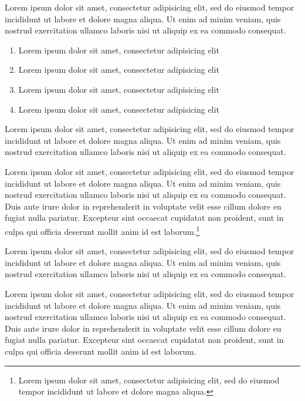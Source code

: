 \documentclass{article}
\begin{document}
\begin{theorem}
Lorem ipsum dolor sit amet, consectetur adipisicing elit, sed do eiusmod tempor incididunt ut labore et dolore magna aliqua. Ut enim ad minim veniam, quis nostrud exercitation ullamco laboris nisi ut aliquip ex ea commodo consequat. 
\end{theorem}

 
\begin{enumerate}
\item Lorem ipsum dolor sit amet, consectetur adipisicing elit
\item Lorem ipsum dolor sit amet, consectetur adipisicing elit
\item Lorem ipsum dolor sit amet, consectetur adipisicing elit
\item Lorem ipsum dolor sit amet, consectetur adipisicing elit
\end{enumerate}

\begin{theorem}
Lorem ipsum dolor sit amet, consectetur adipisicing elit, sed do eiusmod tempor incididunt ut labore et dolore magna aliqua. Ut enim ad minim veniam, quis nostrud exercitation ullamco laboris nisi ut aliquip ex ea commodo consequat. 
\end{theorem}

Lorem ipsum dolor sit amet, consectetur adipisicing elit, sed do eiusmod tempor incididunt ut labore et dolore magna aliqua. Ut enim ad minim veniam, quis nostrud exercitation ullamco laboris nisi ut aliquip ex ea commodo consequat. Duis aute irure dolor in reprehenderit in voluptate velit esse cillum dolore eu fugiat nulla pariatur. Excepteur sint occaecat cupidatat non proident, sunt in culpa qui officia deserunt mollit anim id est laborum.\footnote{Lorem ipsum dolor sit amet, consectetur adipisicing elit, sed do eiusmod tempor incididunt ut labore et dolore magna aliqua.}

\begin{remark}
Lorem ipsum dolor sit amet, consectetur adipisicing elit, sed do eiusmod tempor incididunt ut labore et dolore magna aliqua. Ut enim ad minim veniam, quis nostrud exercitation ullamco laboris nisi ut aliquip ex ea commodo consequat. 
\end{remark}

Lorem ipsum dolor sit amet, consectetur adipisicing elit, sed do eiusmod tempor incididunt ut labore et dolore magna aliqua. Ut enim ad minim veniam, quis nostrud exercitation ullamco laboris nisi ut aliquip ex ea commodo consequat. Duis aute irure dolor in reprehenderit in voluptate velit esse cillum dolore eu fugiat nulla pariatur. Excepteur sint occaecat cupidatat non proident, sunt in culpa qui officia deserunt mollit anim id est laborum.
\end{document}
